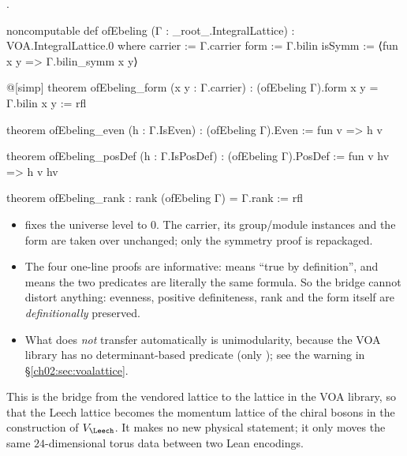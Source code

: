 \begin{definition}\label{ch02:def:ofEbeling}
.
\end{definition}
\begin{leancode}
noncomputable def ofEbeling (Γ : _root_.IntegralLattice) : VOA.IntegralLattice.{0} where
  carrier := Γ.carrier
  form := Γ.bilin
  isSymm := ⟨fun x y => Γ.bilin_symm x y⟩

@[simp] theorem ofEbeling_form (x y : Γ.carrier) : (ofEbeling Γ).form x y = Γ.bilin x y := rfl

theorem ofEbeling_even (h : Γ.IsEven) : (ofEbeling Γ).Even := fun v => h v

theorem ofEbeling_posDef (h : Γ.IsPosDef) : (ofEbeling Γ).PosDef := fun v hv => h v hv

theorem ofEbeling_rank : rank (ofEbeling Γ) = Γ.rank := rfl
\end{leancode}
\begin{dictionary}
\begin{itemize}
\item {} fixes the universe level to $0$.  The carrier, its group/module instances and
  the form are taken over unchanged; only the symmetry proof is repackaged.
\item The four one-line proofs are informative:  means ``true by definition'', and
   means the two predicates are literally the same formula.  So the bridge
  cannot distort anything: evenness, positive definiteness, rank and the form itself are
  \emph{definitionally} preserved.
\item What does \emph{not} transfer automatically is unimodularity, because the VOA library has
  no determinant-based predicate (only ); see the warning in
  \S\ref{ch02:sec:voalattice}.
\end{itemize}
\end{dictionary}
\begin{physics}
This is the bridge from the vendored lattice to the lattice in the VOA library, so that the Leech lattice becomes the momentum lattice of the chiral bosons in the construction of $V_\Leech$. It makes no new physical statement; it only moves the same $24$-dimensional torus data between two Lean encodings.
\end{physics}

